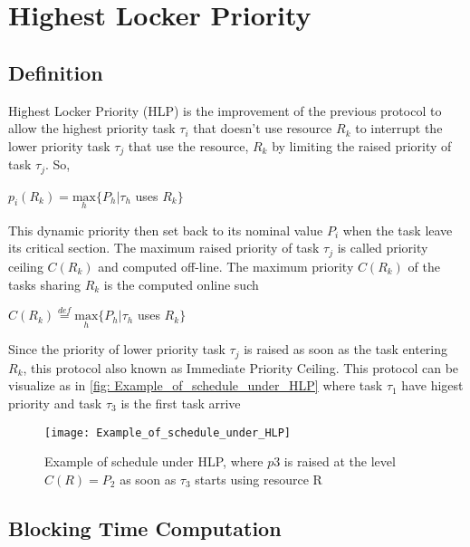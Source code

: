 \section{Highest Locker Priority}

\subsection{Definition}

 Highest Locker Priority (HLP) is the improvement of the previous protocol to allow the highest priority task $\tau_{i}$ that doesn't use resource $R_{k}$ to interrupt the lower priority task $\tau_{j}$ that use the resource, $R_{k}$ by limiting the raised priority of task $\tau_{j}$. So,
 
\begin{center}
 $p_{i}(R_{k})=\underset{h}{\mathrm{max}} \{P_{h}| \tau_{h}$ uses $R_{k}\}  $ 
\end{center}

This dynamic priority then set back to its nominal value $P_{i}$ when the task leave its critical section. The maximum raised priority of task $\tau_{j}$ is called priority ceiling $ C(R_{k}) $ and computed off-line.  The maximum priority $ C(R_{k}) $ of the tasks sharing $ R_{k} $ is the computed online such

\begin{center}
$C(R_{k})\stackrel{def}{=}\underset{h}{\mathrm{max}} \{P_{h}| \tau_{h}$ uses $R_{k}\}  $
\end{center}

Since the priority of lower priority task $\tau_{j}$ is raised as soon as the task entering $ R_{k} $, this protocol also known as Immediate Priority Ceiling. This protocol can be visualize as in \ref{fig: Example_of_schedule_under_HLP} where task $ \tau_{1} $ have higest priority and task $ \tau_{3} $ is the first task arrive

\begin{figure}[h]
    \centering
    \texttt{[image: Example\_of\_schedule\_under\_HLP]}
    \caption{ Example of schedule under HLP, where $ p3 $ is raised at the level $ C(R) = P_{2} $ as soon as $ \tau_{3} $ starts using resource R \cite{b5}}
    \label{fig:Example_of_schedule_under_HLP}
\end{figure}

 
\subsection{Blocking Time Computation}

